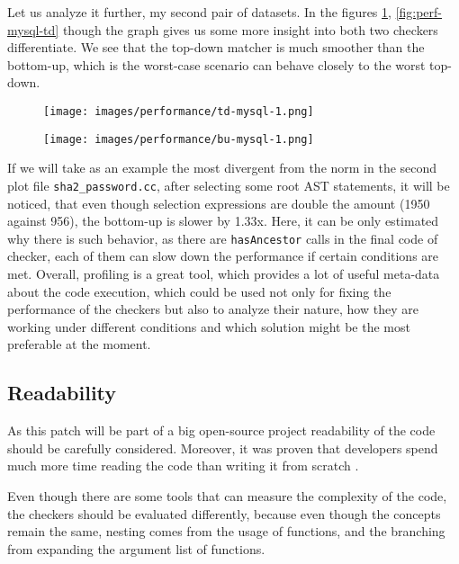 Let us analyze it further, my second pair of datasets. In the figures \ref{fig:perf-mysql-bu}, \ref{fig:perf-mysql-td} though the graph gives us some more insight into both two checkers differentiate. We see that the top-down matcher is much smoother than the bottom-up, which is the worst-case scenario can behave closely to the worst top-down.

\begin{figure}[H]
\centering
\begin{minipage}{.5\textwidth}
  \centering
  \texttt{[image: images/performance/td-mysql-1.png]}
  \label{fig:perf-mysql-td}
\end{minipage}%
\begin{minipage}{.5\textwidth}
  \centering
  \texttt{[image: images/performance/bu-mysql-1.png]}
  \label{fig:perf-mysql-bu}
\end{minipage}
\end{figure}

If we will take as an example the most divergent from the norm in the second plot file \lstinline{sha2_password.cc}, after selecting some root AST statements, it will be noticed, that even though selection expressions are double the amount (1950 against 956), the bottom-up is slower by 1.33x. Here, it can be only estimated why there is such behavior, as there are \lstinline{hasAncestor} calls in the final code of checker, each of them can slow down the performance if certain conditions are met. Overall, profiling is a great tool, which provides a lot of useful meta-data about the code execution, which could be used not only for fixing the performance of the checkers but also to analyze their nature, how they are working under different conditions and which solution might be the most preferable at the moment.


\subsection{Readability}

As this patch will be part of a big open-source project readability of the code should be carefully considered. Moreover, it was proven that developers spend much more time reading the code than writing it from scratch \cite{code-read-write}. 

Even though there are some tools that can measure the complexity of the code, the checkers should be evaluated differently, because even though the concepts remain the same, nesting comes from the usage of functions, and the branching from expanding the argument list of functions.

